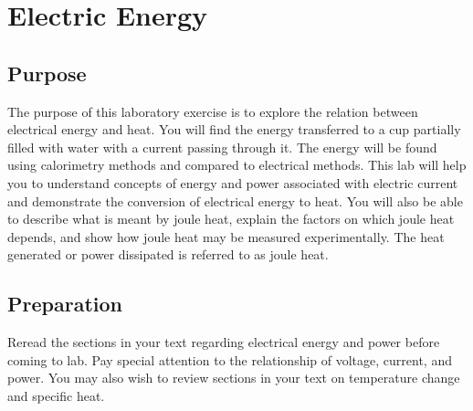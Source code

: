\chapter{Electric Energy}

\begin{multicols}{2}
\section{Purpose}
  The purpose of this laboratory exercise is to explore the relation between electrical energy and heat. You will find the energy transferred to a cup partially filled with water with a current passing through it.  The energy will be found using calorimetry methods and compared to electrical methods.  This lab will help you to understand concepts of energy and power associated with electric current and demonstrate the conversion of electrical energy to heat. You will also be able to describe what is meant by joule heat, explain the factors on which joule heat depends, and show how joule heat may be measured experimentally. The heat generated or power dissipated is referred to as joule heat.

\section{Preparation}
  Reread the sections in your text regarding electrical energy and power before coming to lab. Pay special attention to the relationship of voltage, current, and power.  You may also wish to review sections in your text on temperature change and specific heat.


\end{multicols}
